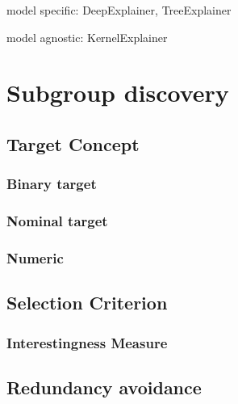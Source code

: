 model specific: DeepExplainer, TreeExplainer

model agnostic: KernelExplainer

\section{Subgroup discovery}

\subsection{Target Concept}

	\subsubsection{Binary target}
	\subsubsection{Nominal target}
	\subsubsection{Numeric}

\subsection{Selection Criterion}
	\subsubsection{Interestingness Measure}
	
\subsection{Redundancy avoidance}
